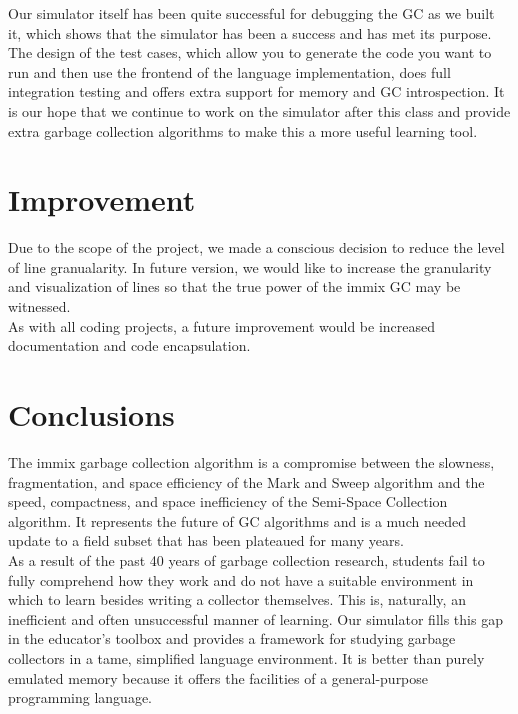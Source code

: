 \documentclass{article}
\begin{document}
  Our simulator itself has been quite successful for debugging the GC as we
  built it, which shows that the simulator has been a success and has met its
  purpose. The design of the test cases, which allow you to generate the code you
  want to run and then use the frontend of the language implementation, does
  full integration testing and offers extra support for memory and GC
  introspection. It is our hope that we continue to work on the simulator after
  this class and provide extra garbage collection algorithms to make this a more
  useful learning tool.

  \section{Improvement}
  Due to the scope of the project, we made a conscious decision to reduce the
  level of line granualarity. In future version, we would like to increase the
  granularity and visualization of lines so that the true power of the immix GC
  may be witnessed. \\

  As with all coding projects, a future improvement would be increased
  documentation and code encapsulation.

  \section{Conclusions}
  The immix garbage collection algorithm is a compromise between the slowness,
  fragmentation, and space efficiency of the Mark and Sweep algorithm and the
  speed, compactness, and space inefficiency of the Semi-Space Collection
  algorithm. It represents the future of GC algorithms and is a much needed
  update to a field subset that has been plateaued for many years. \\

  As a result of the past 40 years of garbage collection research, students
  fail to fully comprehend how they work and do not have a suitable environment
  in which to learn besides writing a collector themselves. This is, naturally,
  an inefficient and often unsuccessful manner of learning. Our simulator fills
  this gap in the educator's toolbox and provides a framework for studying
  garbage collectors in a tame, simplified language environment. It is better
  than purely emulated memory because it offers the facilities of a
  general-purpose programming language.
\end{document}
